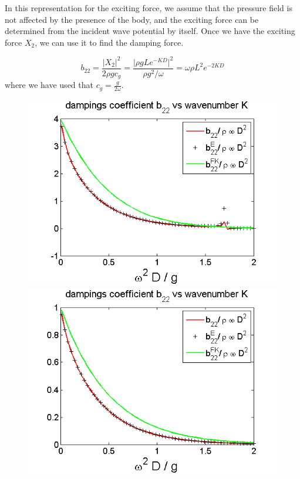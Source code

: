 \documentclass[a4paper,10pt]{article}
\begin{document}
In this representation for the exciting force, we assume that the pressure field is not affected by the presence of the body, and the exciting force can be determined from the incident wave potential by itself. Once we have the exciting force $X_2$, we can use it to find the damping force.

\begin{equation}
b_{22} = \frac{\vert X_2 \vert^2}{2 \rho g c_g} = \frac{\big\vert \rho g L e^{-KD} \big\vert^2}{\rho g^2 / \omega} = \omega \rho L^2 e^{-2 KD}
\end{equation}
where we have used that $c_g = \frac{g}{2 \omega}$.\\[1 em]

\begin{figure}[H]
  \includegraphics[width=\linewidth]{ad_mass_box1_2.png}
  \caption{}\label{add_mass_box1_2}
\endminipage
{}
  \includegraphics[width=\linewidth]{ad_mass_box2_2.png}

\end{figure}
\end{document}
